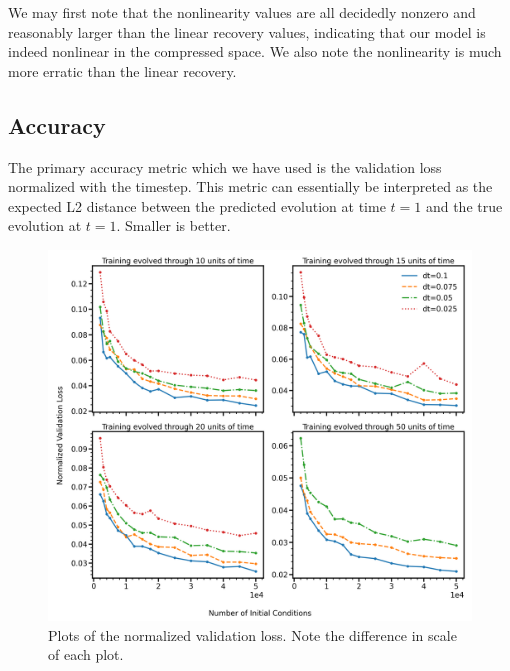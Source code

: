 \documentclass[11pt]{article} %
\numberwithin{equation}{section}  %
\begin{document}
\begin{multicols}{2}

We may first note that the nonlinearity values are all decidedly nonzero and reasonably larger than the linear recovery values, indicating that our model is indeed nonlinear in the compressed space.  We also note the nonlinearity is much more erratic than the linear recovery.


\subsection{Accuracy}\label{Accuracy}
The primary accuracy metric which we have used is the validation loss normalized with the timestep.  This metric can essentially be interpreted as the expected L2 distance between the predicted evolution at time $t=1$ and the true evolution at $t=1$.  Smaller is better.

\end{multicols}

\begin{figure}
	\centering

	\includegraphics[width=\linewidth]{figures/norm_val_loss}

	\caption{Plots of the normalized validation loss.  Note the difference in scale of each plot.}\label{norm_val_loss}

\end{figure}
\end{document}
